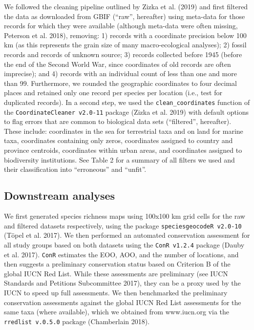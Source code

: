 \documentclass[fleqn,10pt,lineno]{wlpeerj} %
\begin{document}
We followed the cleaning pipeline outlined by Zizka et al. (2019) and first filtered the data as downloaded from GBIF (``raw'', hereafter) using meta-data for those records for which they were available (although meta-data were often missing, Peterson et al. 2018), removing: 1) records with a coordinate precision below 100 km (as this represents the grain size of many macro-ecological analyses); 2) fossil records and records of unknown source; 3) records collected before 1945 (before the end of the Second World War, since coordinates of old records are often imprecise); and 4) records with an individual count of less than one and more than 99. Furthermore, we rounded the geographic coordinates to four decimal places and retained only one record per species per location (i.e., test for duplicated records). In a second step, we used the \texttt{clean\_coordinates} function of the \texttt{CoordinateCleaner\ v2.0-11} package (Zizka et al. 2019) with default options to flag errors that are common to biological data sets (``filtered'', hereafter). These include: coordinates in the sea for terrestrial taxa and on land for marine taxa, coordinates containing only zeros, coordinates assigned to country and province centroids, coordinates within urban areas, and coordinates assigned to biodiversity institutions. See Table 2 for a summary of all filters we used and their classification into ``erroneous'' and ``unfit''.

\hypertarget{downstream-analyses}{%
\subsection*{Downstream analyses}\label{downstream-analyses}}

We first generated species richness maps using 100x100 km grid cells for the raw and filtered datasets respectively, using the package \texttt{speciesgeocodeR\ v2.0-10} (Töpel et al. 2017). We then performed an automated conservation assessment for all study groups based on both datasets using the \texttt{ConR\ v1.2.4} package (Dauby et al. 2017). \texttt{ConR} estimates the EOO, AOO, and the number of locations, and then suggests a preliminary conservation status based on Criterion B of the global IUCN Red List. While these assessments are preliminary (see IUCN Standards and Petitions Subcommittee 2017), they can be a proxy used by the IUCN to speed up full assessments. We then benchmarked the preliminary conservation assessments against the global IUCN Red List assessments for the same taxa (where available), which we obtained from www.iucn.org via the \texttt{rredlist\ v.0.5.0} package (Chamberlain 2018).
\end{document}
